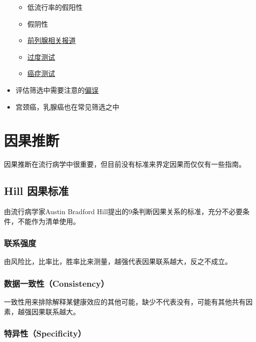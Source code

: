 \documentclass[]{book}
\providecommand{\tightlist}{%
  \setlength{\itemsep}{0pt}\setlength{\parskip}{0pt}}
\begin{document}
\begin{itemize}
  \begin{itemize}
  \tightlist
  \item
    低流行率的假阳性
  \item
    假阴性
  \item
    \href{http://well.blogs.nytimes.com/2012/04/24/older-men-still-being-screened-for-prostate-cancer}{前列腺相关报道}
  \item
    \href{http://www.vaoutcomes.org/papers/Welch_NYTimes_1.pdf}{过度测试}
  \item
    \href{http://well.blogs.nytimes.com/2013/07/29/report-suggests-sweeping-changes-to-cancer-detection-and-treatment}{癌症测试}
  \end{itemize}
\item
  评估筛选中需要注意的\href{http://www.vaoutcomes.org/downloads/Lead_Time_Bias.pdf}{偏误}
\item
  宫颈癌，乳腺癌也在常见筛选之中
\end{itemize}

\section{因果推断}

因果推断在流行病学中很重要，但目前没有标准来界定因果而仅仅有一些指南。

\hypertarget{hill-}{%
\subsection{Hill 因果标准}\label{hill-}}

由流行病学家Austin Bradford Hill提出的9条判断因果关系的标准，充分不必要条件，不能作为清单使用。

\subsubsection{联系强度}

由风险比，比率比，胜率比来测量，越强代表因果联系越大，反之不成立。

\hypertarget{consistency}{%
\subsubsection{数据一致性（Consistency）}\label{consistency}}

一致性用来排除解释某健康效应的其他可能，缺少不代表没有，可能有其他共有因素，越强因果联系越大。

\hypertarget{specificity}{%
\subsubsection{特异性（Specificity）}\label{specificity}}
\end{document}
